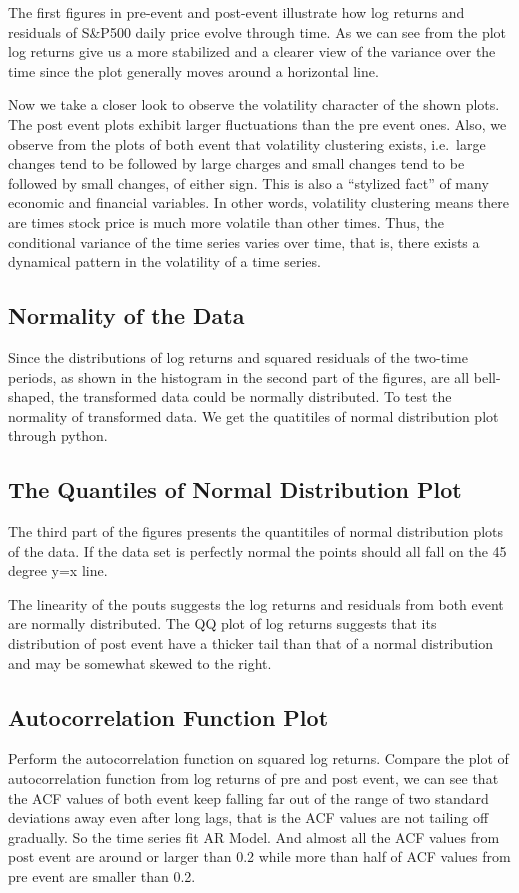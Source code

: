 \documentclass[letterpaper,10pt,english]{/Users/edwsurewin/anaconda/lib/python2.7/site-packages/sphinx/texinputs/sphinxhowto}
\begin{document}
The first figures in pre-event and post-event illustrate how log returns
and residuals of S\&P500 daily price evolve through time. As we can see
from the plot log returns give us a more stabilized and a clearer view
of the variance over the time since the plot generally moves around a
horizontal line.

Now we take a closer look to observe the volatility character of the
shown plots. The post event plots exhibit larger fluctuations than the
pre event ones. Also, we observe from the plots of both event that
volatility clustering exists, i.e.~large changes tend to be followed by
large charges and small changes tend to be followed by small changes, of
either sign. This is also a ``stylized fact'' of many economic and
financial variables. In other words, volatility clustering means there
are times stock price is much more volatile than other times. Thus, the
conditional variance of the time series varies over time, that is, there
exists a dynamical pattern in the volatility of a time series.\subsection{Normality of the Data}\label{normality-of-the-data}Since the distributions of log returns and squared residuals of the
two-time periods, as shown in the histogram in the second part of the
figures, are all bell-shaped, the transformed data could be normally
distributed. To test the normality of transformed data. We get the
quatitiles of normal distribution plot through python.\subsection{The Quantiles of Normal Distribution
Plot}\label{the-quantiles-of-normal-distribution-plot}The third part of the figures presents the quantitiles of normal
distribution plots of the data. If the data set is perfectly normal the
points should all fall on the 45 degree y=x line.

The linearity of the pouts suggests the log returns and residuals from
both event are normally distributed. The QQ plot of log returns suggests
that its distribution of post event have a thicker tail than that of a
normal distribution and may be somewhat skewed to the right.\subsection{Autocorrelation Function
Plot}\label{autocorrelation-function-plot}Perform the autocorrelation function on squared log returns. Compare the
plot of autocorrelation function from log returns of pre and post event,
we can see that the ACF values of both event keep falling far out of the
range of two standard deviations away even after long lags, that is the
ACF values are not tailing off gradually. So the time series fit AR
Model. And almost all the ACF values from post event are around or
larger than 0.2 while more than half of ACF values from pre event are
smaller than 0.2.
\end{document}
